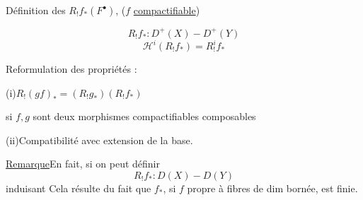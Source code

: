 Définition des $R_!f_*(F^\bullet)$, ($f$ \uline{compactifiable})

\[
R_!f_*:D^+(X)\mathbin{-}D^+(Y)
\]
\[
\mathcal H^i(R_!f_*)=R^i_!f_*
\]

Reformulation des propriétés  :

(i)\quad $R_!(gf)_*=(R_!g_*)(R_!f_*)$

si $f,g$ sont deux morphismes compactifiables composables

(ii)\quad Compatibilité avec extension de la base.

\uline{Remarque}\quad En fait, si
on peut définir
\[
R_!f_*:D(X)\mathbin{-}D(Y)
\]
induisant
Cela résulte du fait que $f_*$, si $f$ propre à fibres de dim bornée,
est   finie.
